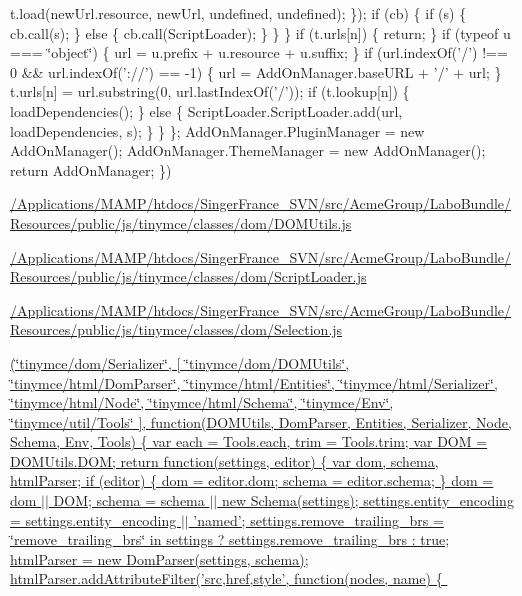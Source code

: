 \begin{DoxyCompactItemize}
{					t.\+load(new\+Url.\+resource, new\+Url, undefined, undefined);
				\}); if (cb) \{ if (s) \{ cb.\+call(s); \} else \{ cb.\+call(\+Script\+Loader); \} \} \} if (t.\+urls\mbox{[}n\mbox{]}) \{ return; \} if (typeof u === \char`\"{}object\char`\"{}) \{ url = u.\+prefix + u.\+resource + u.\+suffix; \} if (url.\+index\+Of('/') !== 0 \&\& url.\+index\+Of('\+://') == -\/1) \{ url = Add\+On\+Manager.\+base\+U\+R\+L + '/' + url; \} t.\+urls\mbox{[}n\mbox{]} = url.\+substring(0, url.\+last\+Index\+Of('/')); if (t.\+lookup\mbox{[}n\mbox{]}) \{ load\+Dependencies(); \} else \{ Script\+Loader.\+Script\+Loader.\+add(url, load\+Dependencies, s); \} \} \}; Add\+On\+Manager.\+Plugin\+Manager = new Add\+On\+Manager(); Add\+On\+Manager.\+Theme\+Manager = new Add\+On\+Manager(); return Add\+On\+Manager; \})}
\item 
\hyperlink{_2_applications_2_m_a_m_p_2htdocs_2_singer_france__s_v_n_2src_2_acme_group_2_labo_bundle_2_resou66bfdfb3504e8cc292fe18c0affa13a2}{/\+Applications/\+M\+A\+M\+P/htdocs/\+Singer\+France\+\_\+\+S\+V\+N/src/\+Acme\+Group/\+Labo\+Bundle/\+Resources/public/js/tinymce/classes/dom/\+D\+O\+M\+Utils.\+js}
\item 
\hyperlink{_2_applications_2_m_a_m_p_2htdocs_2_singer_france__s_v_n_2src_2_acme_group_2_labo_bundle_2_resou80adc1ba549670ec68958e39d46dc4e2}{/\+Applications/\+M\+A\+M\+P/htdocs/\+Singer\+France\+\_\+\+S\+V\+N/src/\+Acme\+Group/\+Labo\+Bundle/\+Resources/public/js/tinymce/classes/dom/\+Script\+Loader.\+js}
\item 
\hyperlink{_2_applications_2_m_a_m_p_2htdocs_2_singer_france__s_v_n_2src_2_acme_group_2_labo_bundle_2_resou9d39e4087be78c99ac0f560b1349414a}{/\+Applications/\+M\+A\+M\+P/htdocs/\+Singer\+France\+\_\+\+S\+V\+N/src/\+Acme\+Group/\+Labo\+Bundle/\+Resources/public/js/tinymce/classes/dom/\+Selection.\+js}
\item 
\hyperlink{_2_applications_2_m_a_m_p_2htdocs_2_singer_france__s_v_n_2src_2_acme_group_2_labo_bundle_2_resoub46421162f7cac9fbfa4fcb29e2c2d66}{(\char`\"{}tinymce/dom/\+Serializer\char`\"{}, \mbox{[} \char`\"{}tinymce/dom/\+D\+O\+M\+Utils\char`\"{}, \char`\"{}tinymce/html/\+Dom\+Parser\char`\"{}, \char`\"{}tinymce/html/\+Entities\char`\"{}, \char`\"{}tinymce/html/\+Serializer\char`\"{}, \char`\"{}tinymce/html/\+Node\char`\"{}, \char`\"{}tinymce/html/\+Schema\char`\"{}, \char`\"{}tinymce/\+Env\char`\"{}, \char`\"{}tinymce/util/\+Tools\char`\"{} \mbox{]}, function(\+D\+O\+M\+Utils, Dom\+Parser, Entities, Serializer, Node, Schema, Env, Tools) \{ var each = Tools.\+each, trim = Tools.\+trim; var D\+O\+M = D\+O\+M\+Utils.\+D\+O\+M;  return function(settings, editor) \{ var dom, schema, html\+Parser; if (editor) \{ dom = editor.\+dom; schema = editor.\+schema; \}  dom = dom $\vert$$\vert$ D\+O\+M; schema = schema $\vert$$\vert$ new Schema(settings); settings.\+entity\+\_\+encoding = settings.\+entity\+\_\+encoding $\vert$$\vert$ 'named'; settings.\+remove\+\_\+trailing\+\_\+brs = \char`\"{}remove\+\_\+trailing\+\_\+brs\char`\"{} in settings ? settings.\+remove\+\_\+trailing\+\_\+brs \+: true; html\+Parser = new Dom\+Parser(settings, schema);  html\+Parser.\+add\+Attribute\+Filter('src,href,style', function(nodes, name) \{
$$}
\end{DoxyCompactItemize}
